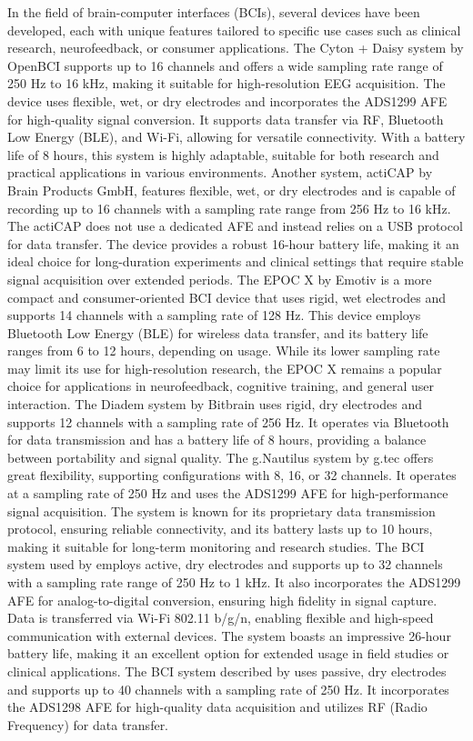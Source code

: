 In the field of brain-computer interfaces (BCIs), several devices have been developed, each with unique features tailored to specific use cases such as clinical research, neurofeedback, or consumer applications. The Cyton + Daisy system by OpenBCI \cite{OpenBCI_CytonDaisy} supports up to 16 channels and offers a wide sampling rate range of 250 Hz to 16 kHz, making it suitable for high-resolution EEG acquisition. The device uses flexible, wet, or dry electrodes and incorporates the ADS1299 AFE for high-quality signal conversion. It supports data transfer via RF, Bluetooth Low Energy (BLE), and Wi-Fi, allowing for versatile connectivity. With a battery life of 8 hours, this system is highly adaptable, suitable for both research and practical applications in various environments. Another system, actiCAP \cite{BrainProducts_ActiCap} by Brain Products GmbH, features flexible, wet, or dry electrodes and is capable of recording up to 16 channels with a sampling rate range from 256 Hz to 16 kHz. The actiCAP does not use a dedicated AFE and instead relies on a USB protocol for data transfer. The device provides a robust 16-hour battery life, making it an ideal choice for long-duration experiments and clinical settings that require stable signal acquisition over extended periods. The EPOC X \cite{Emotiv_EPOCX} by Emotiv is a more compact and consumer-oriented BCI device that uses rigid, wet electrodes and supports 14 channels with a sampling rate of 128 Hz. This device employs Bluetooth Low Energy (BLE) for wireless data transfer, and its battery life ranges from 6 to 12 hours, depending on usage. While its lower sampling rate may limit its use for high-resolution research, the EPOC X remains a popular choice for applications in neurofeedback, cognitive training, and general user interaction. The Diadem \cite{Bitbrain_Diadem} system by Bitbrain uses rigid, dry electrodes and supports 12 channels with a sampling rate of 256 Hz. It operates via Bluetooth for data transmission and has a battery life of 8 hours, providing a balance between portability and signal quality. The g.Nautilus \cite{Gtec_GNautilusProFlexible} system by g.tec offers great flexibility, supporting configurations with 8, 16, or 32 channels. It operates at a sampling rate of 250 Hz and uses the ADS1299 AFE for high-performance signal acquisition. The system is known for its proprietary data transmission protocol, ensuring reliable connectivity, and its battery lasts up to 10 hours, making it suitable for long-term monitoring and research studies. The BCI system used by \cite{pinho2014wireless} employs active, dry electrodes and supports up to 32 channels with a sampling rate range of 250 Hz to 1 kHz. It also incorporates the ADS1299 AFE for analog-to-digital conversion, ensuring high fidelity in signal capture. Data is transferred via Wi-Fi 802.11 b/g/n, enabling flexible and high-speed communication with external devices. The system boasts an impressive 26-hour battery life, making it an excellent option for extended usage in field studies or clinical applications. The BCI system described by \cite{Totev2023} uses passive, dry electrodes and supports up to 40 channels with a sampling rate of 250 Hz. It incorporates the ADS1298 AFE for high-quality data acquisition and utilizes RF (Radio Frequency) for data transfer. 
